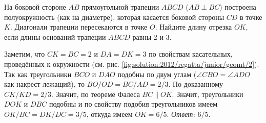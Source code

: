 На боковой стороне $AB$ прямоугольной трапеции $ABCD$ ($AB \perp BC$)
построена полуокружность (как на диаметре), которая касается боковой стороны
$CD$ в точке $K$.
Диагонали трапеции пересекаются в точке $O$.
Найдите длину отрезка $OK$, если длины оснований трапеции $ABCD$ равны 2 и 3.

%
\label{solution:2012/regatta/junior/geomt/2}%
Заметим, что $CK = BC = 2$ и $DA = DK = 3$ по свойствам касательных,
проведённых к окружности
(см. рис. \ref{fig:solution:2012/regatta/junior/geomt/2}).
Так как треугольники $BCO$ и $DAO$ подобны по двум углам
($\angle CBO = \angle ADO$ как накрест лежащий),
то $BO / OD = BC / AD = 2 / 3$.
По доказанному $CK / KD = 2 / 3$.
Значит, по теореме Фалеса $BC \parallel OK$.
Значит, треугольники $DOK$ и $DBC$ подобны и по свойству подобия треугольников
имеем $OK / BC = DK / DC = 3 / 5$, откуда имеем $OK = 6 / 5$.
\emph{Ответ:} $6 / 5$.

